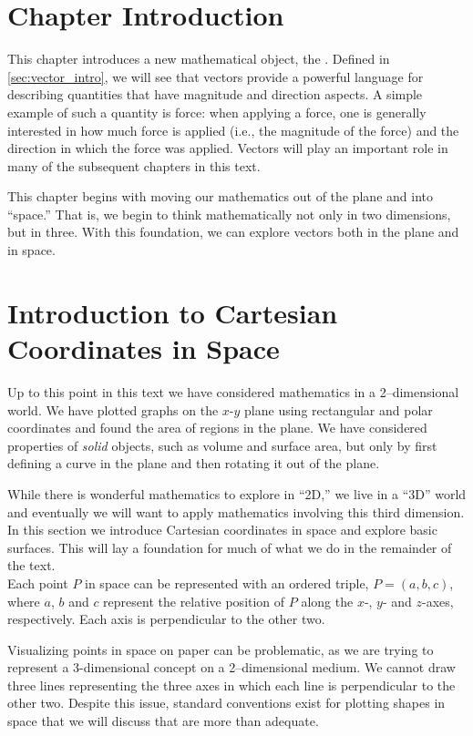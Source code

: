 \iflatexml\section*{Chapter Introduction}\fi

This chapter introduces a new mathematical object, the . Defined in \autoref{sec:vector_intro}, we will see that vectors provide a powerful language for describing quantities that have magnitude and direction aspects. A simple example of such a quantity is force: when applying a force, one is generally interested in how much force is applied (i.e., the magnitude of the force) and the direction in which the force was applied. Vectors will play an important role in many of the subsequent chapters in this text. 

This chapter begins with moving our mathematics out of the plane and into ``space.'' That is, we begin to think mathematically not only in two dimensions, but in three. With this foundation, we can explore vectors both in the plane and in space. 

\section{Introduction to Cartesian Coordinates in Space}\label{sec:space_coord}

Up to this point in this text we have considered mathematics in a 2--dimensional world. We have plotted graphs on the $x$-$y$ plane using rectangular and polar coordinates and found the area of regions in the plane. We have considered properties of \textit{solid} objects, such as volume and surface area, but only by first defining a curve in the plane and then rotating it out of the plane.

While there is wonderful mathematics to explore in ``2D,'' we live in a ``3D'' world and eventually we will want to apply mathematics involving this third dimension. In this section we introduce Cartesian coordinates in space and explore basic surfaces. This will lay a foundation for much of what we do in the remainder of the text.\\

Each point $P$ in space can be represented with an ordered triple, $P=(a,b,c)$, where $a$, $b$ and $c$ represent the relative position of $P$ along the $x$-, $y$- and $z$-axes, respectively. Each axis is perpendicular to the other two.

Visualizing points in space on paper can be problematic, as we are trying to represent a 3-dimensional concept on a 2--dimensional medium. We cannot draw three lines representing the three axes in which each line is perpendicular to the other two. Despite this issue, standard conventions exist for plotting shapes in space that we will discuss that are more than adequate.

